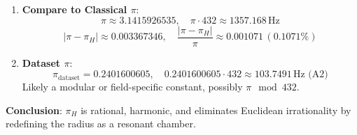 \documentclass[a4paper,12pt]{book}
\begin{document}
\begin{enumerate}
    \item \textbf{Compare to Classical \(\pi\)}:
    \[
    \pi \approx 3.1415926535, \quad \pi \cdot 432 \approx 1357.168 \, \text{Hz}
    \]
    \[
    |\pi - \pi_H| \approx 0.003367346, \quad \frac{|\pi - \pi_H|}{\pi} \approx 0.001071 \, (0.1071\%)
    \]
    
    \item \textbf{Dataset \(\pi\)}:
    \[
    \pi_{\text{dataset}} = 0.2401600605, \quad 0.2401600605 \cdot 432 \approx 103.7491 \, \text{Hz (A2)}
    \]
    Likely a modular or field-specific constant, possibly \(\pi \mod 432\).
\end{enumerate}

\textbf{Conclusion}: \(\pi_H\) is rational, harmonic, and eliminates Euclidean irrationality by redefining the radius as a resonant chamber.
\end{document}

